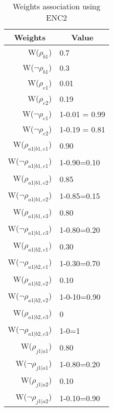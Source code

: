\begin{table}[htb]
\centering
\caption{Weights association using ENC2}
\label{weightsEnc2}
\begin{tabular}{rl}
\hline
\multicolumn{1}{c}{Weights} & \multicolumn{1}{c}{Value} \\ \hline
W(\(\rho_{b1}\)) & 0.7 \\
W(\(\neg\rho_{b1}\)) & 0.3 \\
W(\(\rho_{e1}\)) & 0.01 \\
W(\(\rho_{e2}\)) & 0.19 \\
W(\(\neg\rho_{e1}\)) & 1-0.01 = 0.99 \\
W(\(\neg\rho_{e2}\)) & 1-0.19 = 0.81 \\
W(\(\rho_{a1|b1,e1}\)) & 0.90 \\
W(\(\neg\rho_{a1|b1,e1}\)) & 1-0.90=0.10 \\
W(\(\rho_{a1|b1,e2}\)) & 0.85 \\
\multicolumn{1}{l}{W(\(\neg\rho_{a1|b1,e2}\))} & 1-0.85=0.15 \\
W(\(\rho_{a1|b1,e3}\)) & 0.80 \\
W(\(\neg\rho_{a1|b1,e3}\)) & 1-0.80=0.20 \\
W(\(\rho_{a1|b2,e1}\)) & 0.30 \\
W(\(\neg\rho_{a1|b2,e1}\)) & 1-0.30=0.70 \\
W(\(\rho_{a1|b2,e2}\)) & 0.10 \\
W(\(\neg\rho_{a1|b2,e2}\)) & 1-0-10=0.90 \\
W(\(\rho_{a1|b2,e3}\)) & 0 \\
W(\(\neg\rho_{a1|b2,e3}\)) & 1-0=1 \\
W(\(\rho_{j1|a1}\)) & 0.80 \\
W(\(\neg\rho_{j1|a1}\)) & 1-0.80=0.20 \\
W(\(\rho_{j1|a2}\)) & 0.10 \\
W(\(\neg\rho_{j1|a2}\)) & 1-0.10=0.90
\end{tabular}
\end{table}